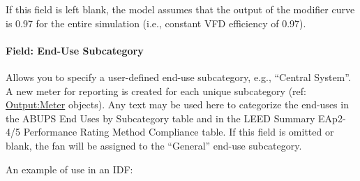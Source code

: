 If this field is left blank, the model assumes that the output of the modifier curve is 0.97 for the entire simulation (i.e., constant VFD efficiency of 0.97).

\paragraph{Field: End-Use Subcategory}\label{field-end-use-subcategory-4}

Allows you to specify a user-defined end-use subcategory, e.g., ``Central System''. A new meter for reporting is created for each unique subcategory (ref: \hyperref[outputmeter-and-outputmetermeterfileonly]{Output:Meter} objects). Any text may be used here to categorize the end-uses in the ABUPS End Uses by Subcategory table and in the LEED Summary EAp2-4/5 Performance Rating Method Compliance table. If this field is omitted or blank, the fan will be assigned to the ``General'' end-use subcategory.

An example of use in an IDF:

